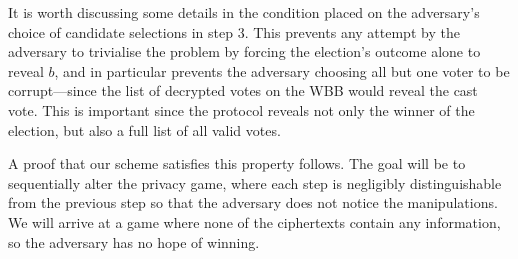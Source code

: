 \documentclass[12pt,a4paper]{article}
\theoremstyle{definition}
\begin{document}
It is worth discussing some details in the condition placed on the adversary's choice of candidate selections in step 3. This prevents any attempt by the adversary to trivialise the problem by forcing the election's outcome alone to reveal $b$, and in particular prevents the adversary choosing all but one voter to be corrupt---since the list of decrypted votes on the WBB would reveal the cast vote. This is important since the protocol reveals not only the winner of the election, but also a full list of all valid votes.

A proof that our scheme satisfies this property follows. The goal will be to sequentially alter the privacy game, where each step is negligibly distinguishable from the previous step so that the adversary does not notice the manipulations. We will arrive at a game where none of the ciphertexts contain any information, so the adversary has no hope of winning.
\end{document}
